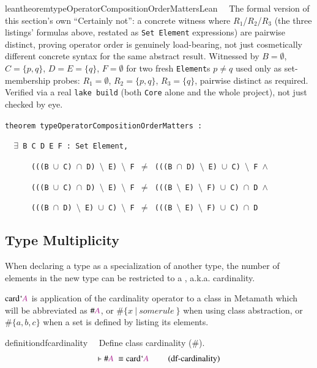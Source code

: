 \begin{restatable}{leantheorem}{typeOperatorCompositionOrderMattersLean}~~
The formal version of this section's own ``Certainly not'': a concrete witness where $R_1$/$R_2$/$R_3$ (the
three listings' formulas above, restated as \texttt{Set Element} expressions) are pairwise distinct, proving
operator order is genuinely load-bearing, not just cosmetically different concrete syntax for the same
abstract result. Witnessed by $B=\emptyset$, $C=\{p,q\}$, $D=E=\{q\}$, $F=\emptyset$ for two fresh
\texttt{Element}s $p\ne q$ used only as set-membership probes: $R_1=\emptyset$, $R_2=\{p,q\}$, $R_3=\{q\}$,
pairwise distinct as required. Verified via a real \texttt{lake build} (both \texttt{Core} alone and the
whole project), not just checked by eye.

\texttt{\textcolor{leancolor}{theorem} \textcolor{leanyellow}{typeOperatorCompositionOrderMatters} :}

\texttt{~~$\exists$ B C D E F : Set Element,}

\texttt{~~~~~~(((B $\cup$ C) $\cap$ D) $\setminus$ E) $\setminus$ F $\ne$ (((B $\cap$ D) $\setminus$ E) $\cup$ C) $\setminus$ F $\wedge$}

\texttt{~~~~~~(((B $\cup$ C) $\cap$ D) $\setminus$ E) $\setminus$ F $\ne$ (((B $\setminus$ E) $\setminus$ F) $\cup$ C) $\cap$ D $\wedge$}

\texttt{~~~~~~(((B $\cap$ D) $\setminus$ E) $\cup$ C) $\setminus$ F $\ne$ (((B $\setminus$ E) $\setminus$ F) $\cup$ C) $\cap$ D}
\label{typeOperatorCompositionOrderMatters}
\end{restatable}

\subsection{Type Multiplicity}

\pn When declaring a type as a specialization of another type, the number of elements in the new type can be restricted to a , a.k.a. cardinality.  

\pn $\mathrm{card} ` \mc{A}$ is application of the cardinality operator to a class in Metamath which will be abbreviated as  $\#\mc{A}$, or $\#\{x~\vert~some rule~\}$ when using class abstraction, or $\#\{a, b, c\}$ when a set is defined by listing its elements.

\begin{restatable}{definition}{dfcardinality}~~ Define class cardinality (\#).
\begin{align}
\vdash \#\mc{A}~\equiv \mathrm{card} ` \mc{A}~\label{eq:df-cardinality}\tag{df-cardinality}
\end{align}
\end{restatable}

